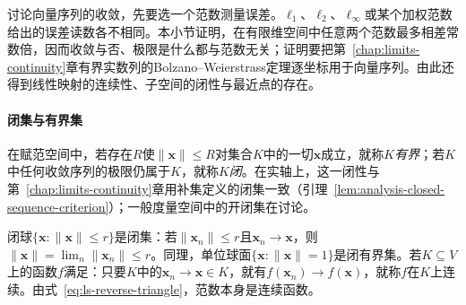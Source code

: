 讨论向量序列的收敛，先要选一个范数测量误差。$\ell_1$、$\ell_2$、$\ell_\infty$或某个加权范数给出的误差读数各不相同。本小节证明，在有限维空间中任意两个范数最多相差常数倍，因而收敛与否、极限是什么都与范数无关；证明要把第~\ref{chap:limits-continuity}章有界实数列的Bolzano--Weierstrass定理逐坐标用于向量序列。由此还得到线性映射的连续性、子空间的闭性与最近点的存在。

\paragraph{闭集与有界集}
在赋范空间中，若存在$R$使$\lVert\bm x\rVert\leq R$对集合$K$中的一切$\bm x$成立，就称$K$\emph{有界}；若$K$中任何收敛序列的极限仍属于$K$，就称$K$\emph{闭}。在实轴上，这一闭性与第~\ref{chap:limits-continuity}章用补集定义的闭集一致（引理~\ref{lem:analysis-closed-sequence-criterion}）；一般度量空间中的开闭集在讨论。

闭球$\{\bm x:\lVert\bm x\rVert\leq r\}$是闭集：若$\lVert\bm x_n\rVert\leq r$且$\bm x_n\to\bm x$，则$\lVert\bm x\rVert=\lim_n\lVert\bm x_n\rVert\leq r$。同理，单位球面$\{\bm x:\lVert\bm x\rVert=1\}$是闭有界集。若$K\subseteq V$上的函数$f$满足：只要$K$中的$\bm x_n\to\bm x\in K$，就有$f(\bm x_n)\to f(\bm x)$，就称$f$在$K$上连续。由式~\eqref{eq:ls-reverse-triangle}，范数本身是连续函数。

